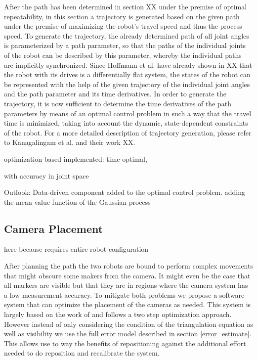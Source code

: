 \documentclass[5p,times,procedia]{elsarticle}
\begin{document}
After the path has been determined in section XX under the premise of optimal repeatability, in this section a trajectory is generated based on the given path under the premise of maximizing the robot’s travel speed and thus the process speed. To generate the trajectory, the already determined path of all joint angles is parameterized by a path parameter, so that the paths of the individual joints of the robot can be described by this parameter, whereby the individual paths are implicitly synchronized. Since Hoffmann et al. have already shown in XX that the robot with its drives is a differentially flat system, the states of the robot can be represented with the help of the given trajectory of the individual joint angles and the path parameter and its time derivatives. In order to generate the trajectory, it is now sufficient to determine the time derivatives of the path parameters by means of an optimal control problem in such a way that the travel time is minimized, taking into account the dynamic, state-dependent constraints of the robot.  For a more detailed description of trajectory generation, please refer to Kanagalingam et al. and their work XX.  


optimization-based
implemented: time-optimal, 

with accuracy in joint space

Outlook: Data-driven component added to the optimal control problem.
adding the mean value function of the Gaussian process

\subsection{Camera Placement}
here because requires entire robot configuration

After planning the path the two robots are bound to perform complex movements that might obscure some makers from the camera.
It might even be the case that all markers are visible but that they are in regions where the camera system has a low measurement accuracy.
To mitigate both problems we propose a software system that can optimize the placement of the cameras as needed.
This system is largely based on the work of \cite{camera_placement} and follows a two step optimization approach.
However instead of only considering the condition of the triangulation equation as well as visibility we use the full error model described in section \ref{error_estimate}.
This allows use to way the benefits of repositioning against the additional effort needed to do reposition and recalibrate the system.
\end{document}
